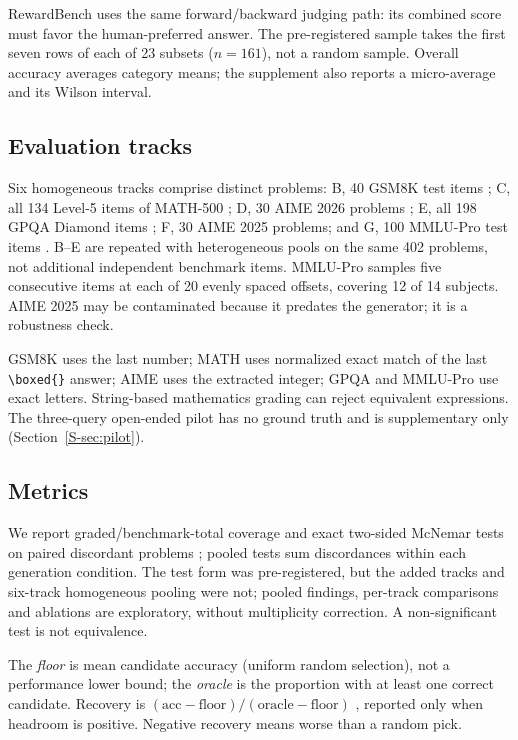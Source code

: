 \documentclass[preprint,11pt,number,sort&compress]{elsarticle}
\begin{document}
RewardBench \citep{rewardbench2025} uses the same forward/backward judging
path: its combined score must favor the human-preferred answer. The
pre-registered sample takes the first seven rows of each of 23 subsets
($n=161$), not a random sample. Overall accuracy averages category means;
the supplement also reports a micro-average and its Wilson interval.

\subsection{Evaluation tracks}
\label{sec:tracks}

Six homogeneous tracks comprise \TotalProblems{} distinct problems:
B, 40 GSM8K test items \citep{cobbe2021gsm8k}; C, all 134 Level-5 items
of MATH-500 \citep{hendrycks2021math,lightman2023letsverify}; D, 30 AIME
2026 problems \citep{matharena2025aime}; E, all 198 GPQA Diamond items
\citep{rein2024gpqa}; F, 30 AIME 2025 problems; and G, 100 MMLU-Pro test
items \citep{wang2024mmlupro}. B--E are repeated with heterogeneous pools
on the same 402 problems, not additional independent benchmark items.
MMLU-Pro samples five consecutive items at each of 20 evenly spaced
offsets, covering 12 of 14 subjects. AIME 2025 may be contaminated because
it predates the generator; it is a robustness check.

GSM8K uses the last number; MATH uses normalized exact match of the last
\texttt{\textbackslash boxed\{\}} answer; AIME uses the extracted integer;
GPQA and MMLU-Pro use exact letters. String-based mathematics grading can
reject equivalent expressions. The three-query open-ended pilot has no
ground truth and is supplementary only (Section~\ref{S-sec:pilot}).

\subsection{Metrics}
\label{sec:metrics}

We report graded/benchmark-total coverage and exact two-sided McNemar tests
on paired discordant problems \citep{fagerland2013mcnemar}; pooled tests sum
discordances within each generation condition. The test form was
pre-registered, but the added tracks and six-track homogeneous pooling were
not; pooled findings, per-track comparisons and ablations are exploratory,
without multiplicity correction. A non-significant test is not equivalence.

The \emph{floor} is mean candidate accuracy (uniform random selection),
not a performance lower bound; the \emph{oracle} is the proportion with
at least one correct candidate. Recovery is
$(\mathrm{acc}-\mathrm{floor})/(\mathrm{oracle}-\mathrm{floor})$
\citep[cf.][]{landesberg2026bestofn}, reported only when headroom is positive.
Negative recovery means worse than a random pick.
\end{document}
